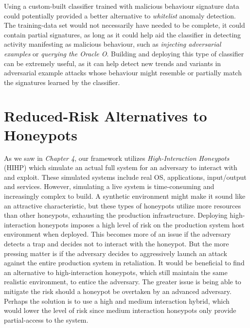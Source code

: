 \documentclass[grad,lot,lof,11pt,oneside,onehalfspace]{RUthesis}
\begin{document}
Using a custom-built classifier trained with malicious behaviour signature data could potentially provided a better alternative to \textit{whitelist} anomaly detection. The training-data set  would not necessarily have needed to be complete, it could  contain partial signatures, as long as it could help aid the classifier in detecting activity manifesting as malicious behaviour, such as \textit{injecting adversarial examples} or \textit{querying the Oracle O}. Building and deploying this type of classifier can be extremely useful, as it can help detect new trends and variants in adversarial example attacks whose behaviour might resemble or partially match the signatures learned by the classifier.

\section{Reduced-Risk Alternatives to Honeypots} 
As we saw in \textit{Chapter 4}, our framework utilizes \textit{High-Interaction Honeypots} (HIHP) which simulate an actual full system for an adversary to interact with and exploit. These simulated systems include real OS, applications, input/output and services. However, simulating a live system is time-consuming and increasingly complex to build. A synthetic environment might make it sound like an attractive characteristic, but these types of honeypots utilize more resources than  other honeypots, exhausting the production infrastructure. Deploying high-interaction honeypots imposes a high level of risk on the production system host environment when deployed. This becomes more of an issue if the adversary detects a trap and decides not to interact with the honeypot. But the more pressing matter is if the adversary decides to aggressively launch an attack against the entire production system in retaliation. It would be beneficial to find an alternative to high-interaction honeypots, which still maintain the same realistic environment, to entice the adversary. The greater issue is being able to mitigate the risk should a honeypot be overtaken by an advanced adversary.  Perhaps the solution is to use a high and medium interaction hybrid, which would lower the level of risk since medium interaction honeypots only provide partial-access to the system. 
\end{document}

